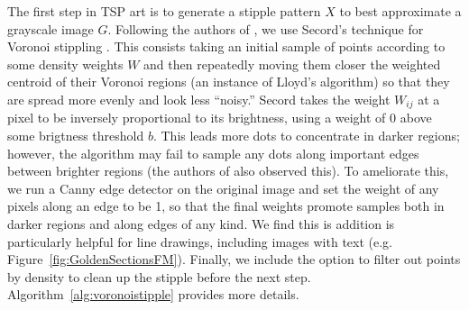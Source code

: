 \documentclass[runningheads]{llncs}
\begin{document}

The first step in TSP art is to generate a stipple pattern $X$ to best approximate a grayscale image $G$.  Following the authors of \cite{kaplan2005tsp}, we use Secord's technique for Voronoi stippling \cite{secord2002weighted}.  This consists taking an initial sample of points according to some density weights $W$ and then repeatedly moving them closer the weighted centroid of their Voronoi regions (an instance of Lloyd's algorithm) so that they are spread more evenly and look less ``noisy.''  Secord \cite{secord2002weighted} takes the weight $W_{ij}$ at a pixel to be inversely proportional to its brightness, using a weight of $0$ above some brigtness threshold $b$.  This leads more dots to concentrate in darker regions; however, the algorithm may fail to sample any dots along important edges between brighter regions (the authors of \cite{li2011structure} also observed this).   To ameliorate this, we run a Canny edge detector \cite{canny1986computational} on the original image and set the weight of any pixels along an edge to be 1, so that the final weights promote samples both in darker regions and along edges of any kind.  We find this is addition is particularly helpful for line drawings, including images with text (e.g. Figure~\ref{fig:GoldenSectionsFM}).  Finally, we include the option to filter out points by density to clean up the stipple before the next step.  Algorithm~\ref{alg:voronoistipple} provides more details.
\end{document}
